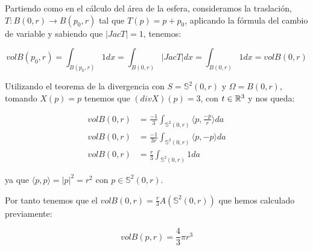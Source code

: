 \begin{remark}
Partiendo como en el cálculo del área de la esfera, consideramos la traslación, $T: B(0, r) \longrightarrow B(p_0, r)$ tal que $T(p) = p + p_0$, aplicando la fórmula del cambio de variable y sabiendo que $|JacT|=1$, tenemos:

\begin{equation*}
    vol B(p_0,r) = \int_{B(p_0,r)} 1 dx = \int_{B(0,r)} |JacT|dx = \int_{B(0,r)} 1dx = vol B(0,r)
\end{equation*}

Utilizando el teorema de la divergencia con $S=\mathbb{S}^2(0,r)$ y $\Omega=B(0,r)$, tomando $X(p)=p$ tenemos que $(div X)(p)=3$, con $t\in \mathbb{R}^3$ y nos queda:

\begin{align*}
    vol B(0,r) &= \frac{-1}{3} \int_{\mathbb{S}^2(0,r)}  \langle p, \frac{-p}{r} \rangle da \\
    vol B(0,r) &= \frac{-1}{3r} \int_{\mathbb{S}^2(0,r)}  \langle p, -p \rangle da \\
    vol B(0,r) &= \frac{r}{3} \int_{\mathbb{S}^2(0,r)} 1da
\end{align*}

ya que $ \langle p,p \rangle  = |p|^2 = r^2$ con $p \in \mathbb{S}^2(0,r)$.

Por tanto tenemos que el $vol B(0,r) = \frac{r}{3}A(\mathbb{S}^2(0,r))$ que hemos calculado previamente:

\begin{equation*}
    vol B(p,r) = \frac{4}{3}\pi r^3
\end{equation*}
\end{remark}

